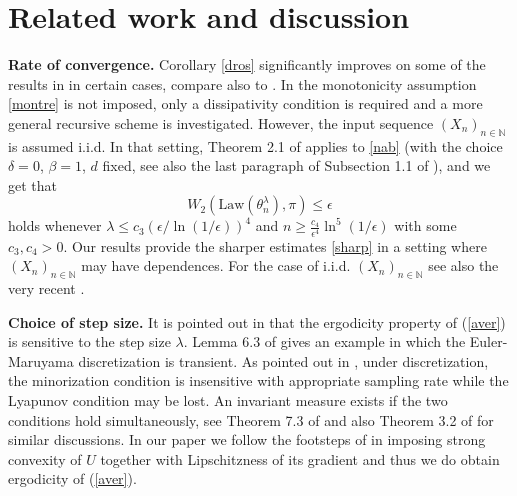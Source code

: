 \documentclass[a4paper]{article}
\begin{document}
\section{Related work and discussion}\label{sec_diss}
\textbf{Rate of convergence.}
Corollary \ref{dros} significantly improves on some of the results in \cite{raginsky} in certain cases, compare also to \cite{xu}. In \cite{raginsky} the monotonicity assumption \eqref{montre} is not imposed, only a dissipativity condition is required and a more general recursive scheme is investigated. However, the input sequence $(X_n)_{n\in\mathbb{N}}$ is assumed i.i.d. In that setting, Theorem 2.1 of
		\cite{raginsky} applies to \eqref{nab} (with the choice $\delta=0$,
		$\beta=1$, $d$ fixed, see also the last paragraph of Subsection 1.1
		of \cite{raginsky}), and we get that
		$$
		W_2(\mathrm{Law}(\theta^{\lambda}_n),\pi)\leq \epsilon
		$$
		holds whenever
		$\lambda\leq c_3(\epsilon/\ln(1/\epsilon))^4$ and
		$n\geq \frac{c_4}{\epsilon^4}\ln^5(1/\epsilon)$ with some $c_3,c_4>0$.
		Our results provide the sharper estimates \eqref{sharp} in a setting where $(X_n)_{n \in \mathbb{N}}$ may have dependences. For the case of i.i.d. $(X_n)_{n \in \mathbb{N}}$ see also the very
recent \cite{alex}.

\textbf{Choice of step size.} It is pointed out in \cite{Rob1996} that the ergodicity property of (\ref{aver}) is sensitive to the step size $\lambda$. Lemma 6.3 of \cite{mattingly} gives an example in which the Euler-Maruyama discretization is transient. As pointed out in \cite{mattingly}, under discretization, the minorization condition is insensitive with appropriate sampling rate while the Lyapunov condition may be lost. An invariant measure exists if the two conditions hold simultaneously, see Theorem 7.3 of \cite{mattingly} and also Theorem 3.2 of \cite{Rob1996} for similar discussions. In our paper we follow the footsteps of
\cite{dalalyan} in imposing strong convexity of $U$ together with Lipschitzness of its gradient and thus we do obtain ergodicity of (\ref{aver}).
\end{document}
